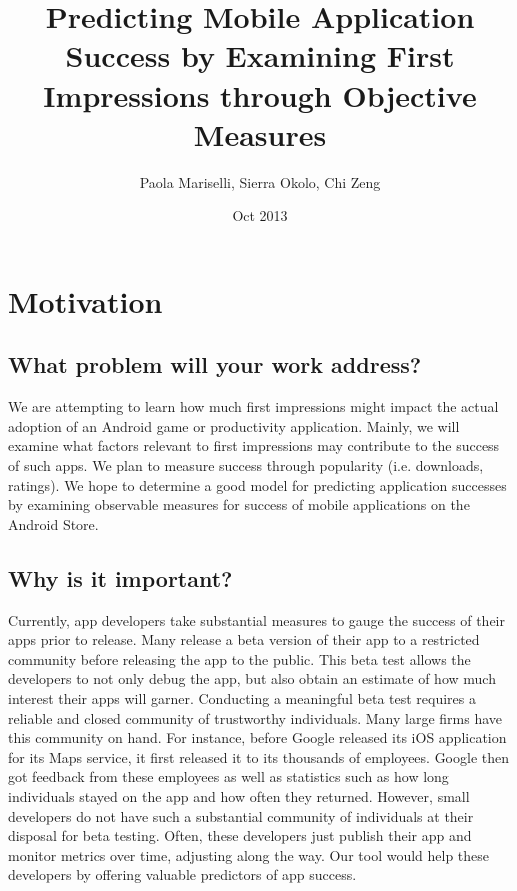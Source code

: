 \documentclass{article}
\title{Predicting Mobile Application Success by Examining First Impressions through Objective Measures}
\author{Paola Mariselli, Sierra Okolo, Chi Zeng}
\date{Oct 2013}
\begin{document}
\maketitle


\section{Motivation}

\subsection{What problem will your work address?}

We are attempting to learn how much first impressions might impact the actual adoption of an Android game or productivity application. Mainly, we will examine what factors relevant to first impressions may contribute to the success of such apps. We plan to measure success through popularity (i.e. downloads, ratings). We hope to determine a good model for predicting application successes by examining observable measures for success of mobile applications on the Android Store.

\subsection{Why is it important?}

Currently, app developers take substantial measures to gauge the success of their apps prior to release. Many release a beta version of their app to a restricted community before releasing the app to the public. This beta test allows the developers to not only debug the app, but also obtain an estimate of how much interest their apps will garner. Conducting a meaningful beta test requires a reliable and closed community of trustworthy individuals. Many large firms have this community on hand. For instance, before Google released its iOS application for its Maps service, it first released it to its thousands of employees. Google then got feedback from these employees as well as statistics such as how long individuals stayed on the app and how often they returned. However, small developers do not have such a substantial community of individuals at their disposal for beta testing. Often, these developers just publish their app and monitor metrics over time, adjusting along the way. Our tool would help these developers by offering valuable predictors of app success. \\
\end{document}
